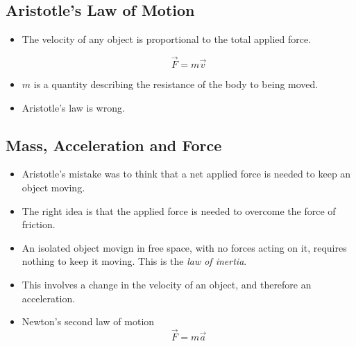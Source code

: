 \documentclass[../main.tex]{subfiles}
\begin{document}
\subsection{Aristotle's Law of Motion}

\begin{itemize}
    \item The velocity of any object is proportional to the total applied
        force.

        \begin{equation}
            \vec{F} = m \vec{v}
        \end{equation}

    \item $m$ is a quantity describing the resistance of the body to being
        moved.

    \item Aristotle's law is wrong.
\end{itemize}

\subsection{Mass, Acceleration and Force}

\begin{itemize}

    \item Aristotle's mistake was to think that a net applied force is needed
        to keep an object moving.

    \item The right idea is that the applied force is needed to overcome the force of friction.
        
    \item An isolated object movign in free space, with no forces acting on it,
        requires nothing to keep it moving. This is the \textit{law of
        inertia}.

    \item This involves a change in the velocity of an object, and therefore an
        acceleration. 

    \item Newton's second law of motion
        \begin{equation}
            \vec{F} = m\vec{a}
        \end{equation}

\end{itemize}
\end{document}

